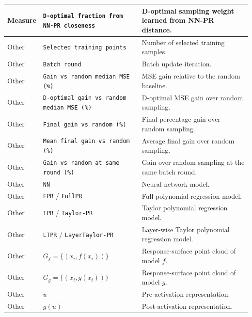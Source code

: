 \documentclass[]{interact}
\theoremstyle{plain}
\theoremstyle{definition}
\theoremstyle{remark}
\begin{document}
\begin{longtable}{p{}p{}p{}}
Measure
& \texttt{D-optimal fraction from NN-PR closeness}
& D-optimal sampling weight learned from NN-PR distance. \\

\midrule

Other
& \texttt{Selected training points}
& Number of selected training samples. \\

Other
& \texttt{Batch round}
& Batch update iteration. \\

Other
& \texttt{Gain vs random median MSE (\%)}
& MSE gain relative to the random baseline. \\

Other
& \texttt{D-optimal gain vs random median MSE (\%)}
& D-optimal MSE gain over random sampling. \\

Other
& \texttt{Final gain vs random (\%)}
& Final percentage gain over random sampling. \\

Other
& \texttt{Mean final gain vs random (\%)}
& Average final gain over random sampling. \\

Other
& \texttt{Gain vs random at same round (\%)}
& Gain over random sampling at the same batch round. \\

Other
& \texttt{NN}
& Neural network model. \\

Other
& \texttt{FPR} / \texttt{FullPR}
& Full polynomial regression model. \\

Other
& \texttt{TPR} / \texttt{Taylor-PR}
& Taylor polynomial regression model. \\

Other
& \texttt{LTPR} / \texttt{LayerTaylor-PR}
& Layer-wise Taylor polynomial regression model. \\

Other
& $G_f=\{(x_i,f(x_i))\}$
& Response-surface point cloud of model $f$. \\

Other
& $G_g=\{(x_i,g(x_i))\}$
& Response-surface point cloud of model $g$. \\

Other
& $u$
& Pre-activation representation. \\

Other
& $g(u)$
& Post-activation representation. \\

\end{longtable}
\end{document}
